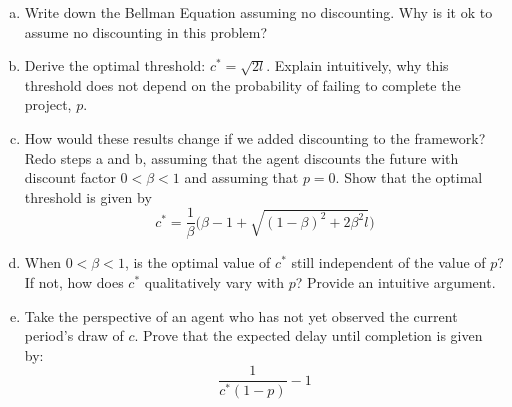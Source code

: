 \documentclass[11pt]{extarticle}
\theoremstyle{plain}
\theoremstyle{definition}
\begin{document}
\vspace{5mm}
\begin{enumerate}[(a)]
\item Write down the Bellman Equation assuming no discounting. Why is it ok to assume no discounting in this problem?

\item Derive the optimal threshold: $c^* = \sqrt{2l}$. Explain intuitively, why this threshold does not depend on the probability of failing to complete the project, $p$. 

\item How would these results change if we added discounting to the framework? Redo steps a and b, assuming that the agent discounts the future with discount factor $0 < \beta < 1$ and assuming that $p = 0$. Show that the optimal threshold is given by
\begin{equation*}
	c^* = \frac{1}{\beta} \bigg( \beta - 1 + \sqrt{ (1-\beta)^2 + 2 \beta^2 l } \bigg)
\end{equation*}

\item When $0 < \beta < 1$, is the optimal value of $c^*$ still independent of the value of $p$? If not, how does $c^*$ qualitatively vary with $p$? Provide an intuitive argument.

\item Take the perspective of an agent who has not yet observed the current period's draw of $c$. Prove that the expected delay until completion is given by:
\begin{equation*}
	\frac{1}{c^*(1-p)} - 1
\end{equation*}

\end{enumerate}
\end{document}

